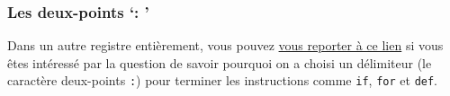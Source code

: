     \hypertarget{les-deux-points}{%
\subsubsection{Les deux-points `: '}\label{les-deux-points}}

    Dans un autre registre entièrement, vous pouvez
\href{https://docs.python.org/3/faq/design.html\#why-are-colons-required-for-the-if-while-def-class-statements}{vous
reporter à ce lien} si vous êtes intéressé par la question de savoir
pourquoi on a choisi un délimiteur (le caractère deux-points \texttt{:})
pour terminer les instructions comme \texttt{if}, \texttt{for} et
\texttt{def}.